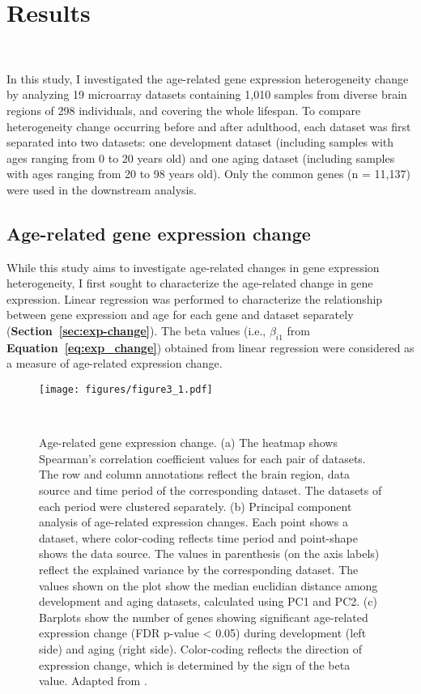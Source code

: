 \chapter{Results}~\label{chp:b3}

In this study, I investigated the age-related gene expression heterogeneity change by analyzing 19 microarray datasets
containing 1,010 samples from diverse brain regions of 298 individuals, and covering the whole lifespan.
To compare heterogeneity change occurring before and after adulthood, each dataset was first separated into two datasets: one development dataset 
(including samples with ages ranging from 0 to 20 years old) and one aging dataset (including samples with ages ranging from 20 to 98 years old).
Only the common genes (n = 11,137) were used in the downstream analysis.

\section{Age-related gene expression change}
While this study aims to investigate age-related changes in gene expression heterogeneity, I first sought to characterize the age-related change in gene expression.
Linear regression was performed to characterize the relationship between gene expression and age for each gene and dataset separately (\textbf{Section~\ref{sec:exp-change}}).
The beta values (i.e., $\beta_{i1}$ from \textbf{Equation~\ref{eq:exp_change}}) obtained from linear regression were considered as a measure of age-related expression change.

\begin{figure}[!ht]
    \centering
    \texttt{[image: figures/figure3\_1.pdf]}
    \caption{Age-related gene expression change. 
    (a) The heatmap shows Spearman's correlation coefficient values for each pair of datasets.
    The row and column annotations reflect the brain region, data source and time period of the corresponding dataset.
    The datasets of each period were clustered separately.
    (b) Principal component analysis of age-related expression changes. Each point shows a dataset, 
    where color-coding reflects time period and point-shape shows the data source. 
    The values in parenthesis (on the axis labels) reflect the explained variance by the corresponding dataset.
    The values shown on the plot show the median euclidian distance among development and aging datasets, 
    calculated using PC1 and PC2.
    (c) Barplots show the number of genes showing significant age-related expression change (FDR p-value < 0.05) during development (left side) and aging (right side).
    Color-coding reflects the direction of expression change, which is determined by the sign of the beta value.
    Adapted from \autocite{Isildak2020}.
    }~\label{fig:fig3.1}
\end{figure}

